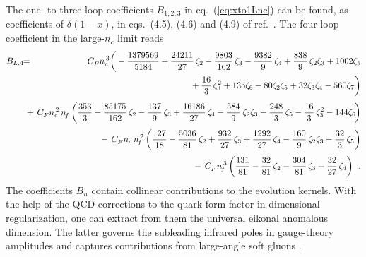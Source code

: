 \documentclass[12pt]{article}
\newcommand{\bea}{\begin{eqnarray}}
\newcommand{\eea}{\end{eqnarray}}
\newcommand{\hspn}{{\hspace{-5mm}}}
\newcommand{\hspp}{{\hspace{5mm}}}
\def\nc{{n_c}}
\def\ncs{{n_{c}^{\,2}}}
\def\nct{{n_{c}^{\,3}}}
\def\cf{{C^{}_F}}
\def\nf{{n^{}_{\! f}}}
\def\nfs{{n^{\,2}_{\! f}}}
\def\nft{{n^{\,3}_{\! f}}}
\begin{document}
The one- to three-loop coefficients $B_{1,2,3}$ in eq.~(\ref{eq:xto1Lnc})
can be found, as coefficients of $\delta(1\!-\!x)$, in  eqs.~(4.5), (4.6)
and (4.9) of ref.~\cite{Moch:2004pa}. The four-loop coefficient in the 
large-$\nc$ limit reads
%
\bea
\label{eq:B4Lnc}
 B_{L,4} &\!\!=\!& 
         \cf \* \nct \* \bigg(
          - \frac{1379569}{5184}
          + \frac{24211}{27} \,\* \zeta_2
          - \frac{9803}{162} \,\* \zeta_3
          - \frac{9382}{9} \,\* \zeta_4
          + \frac{838}{9} \,\* \zeta_2 \* \zeta_3
          + 1002 \* \zeta_5
\nonumber \\ && \mbox{\hspp\hspp}
          + \frac{16}{3} \,\* \zeta_3^2
          + 135 \* \zeta_6
          - 80 \* \zeta_2 \* \zeta_5
          + 32 \* \zeta_3 \* \zeta_4
          - 560 \* \zeta_7
          \biggr)
\nonumber \\[1mm] && \mbox{\hspn}
       +\, \cf\*\ncs\*\,\nf \* \left(
            \frac{353}{3}
          - \frac{85175}{162} \,\* \zeta_2
          - \frac{137}{9} \,\* \zeta_3
          + \frac{16186}{27} \,\* \zeta_4
          - \frac{584}{9} \,\* \zeta_2 \* \zeta_3
          - \frac{248}{3} \,\* \zeta_5
          - \frac{16}{3} \,\* \zeta_3^2
          - 144 \* \zeta_6
\!
          \right)
\nonumber \\[1mm] && \mbox{\hspn}
       -\, \cf\*\nc\*\,\nfs \* \left(
            \frac{127}{18}
          - \frac{5036}{81} \,\* \zeta_2
          + \frac{932}{27} \,\* \zeta_3
          + \frac{1292}{27} \,\* \zeta_4
          - \frac{160}{9} \,\* \zeta_2 \* \zeta_3
          - \frac{32}{3} \,\* \zeta_5
          \right)
\nonumber \\[1mm] && \mbox{\hspn}
       -\, \cf\*\nft \* \left(
            \frac{131}{81}
          - \frac{32}{81} \,\* \zeta_2
          - \frac{304}{81} \,\* \zeta_3
          + \frac{32}{27} \,\* \zeta_4
          \right)
\:\: . 
\eea
%
%
The coefficients $B_n$ contain collinear contributions to the evolution 
kernels. With the help of the QCD corrections to the quark form factor in 
dimensional regularization, one can extract from them the universal eikonal 
anomalous dimension.
The latter governs the subleading infrared poles in gauge-theory amplitudes
and captures contributions from large-angle soft gluons
\cite{Ravindran:2004mb,Ravindran:2006cg,Dixon:2008gr}.
\end{document}

